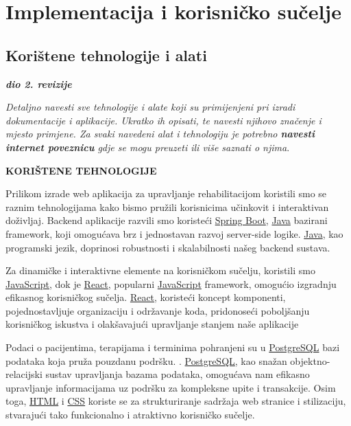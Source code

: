 \chapter{Implementacija i korisničko sučelje}
		
		
		\section{Korištene tehnologije i alati}
		
			\textbf{\textit{dio 2. revizije}}
			
			 \textit{Detaljno navesti sve tehnologije i alate koji su primijenjeni pri izradi dokumentacije i aplikacije. Ukratko ih opisati, te navesti njihovo značenje i mjesto primjene. Za svaki navedeni alat i tehnologiju je potrebno \textbf{navesti internet poveznicu} gdje se mogu preuzeti ili više saznati o njima}.
			
\textbf{	KORIŠTENE TEHNOLOGIJE
} 

Prilikom izrade web aplikacija za upravljanje rehabilitacijom koristili smo se raznim tehnologijama kako bismo pružili korisnicima učinkovit i interaktivan doživljaj. Backend aplikacije razvili smo koristeći \href{https://www.spring.io/projects/spring-boot}{Spring Boot}, \href{https://www.oracle.com/java}{Java} bazirani framework, koji omogućava brz i jednostavan razvoj server-side logike. \href{https://www.oracle.com/java}{Java}, kao programski jezik, doprinosi robustnosti i skalabilnosti našeg backend sustava.

Za dinamičke i interaktivne elemente na korisničkom sučelju, koristili smo \href{https://www.developer.mozilla.org/en-US/docs/Web/JavaScript}{JavaScript}, dok je \href{https://www.reactjs.org}{React}, popularni \href{https://www.developer.mozilla.org/en-US/docs/Web/JavaScript}{JavaScript} framework, omogućio izgradnju efikasnog korisničkog sučelja. \href{https://www.reactjs.org}{React}, koristeći koncept komponenti, pojednostavljuje organizaciju i održavanje koda, pridonoseći poboljšanju korisničkog iskustva i olakšavajući upravljanje stanjem naše aplikacije 

Podaci o pacijentima, terapijama i terminima pohranjeni su u \href{https://www.postgresql.org}{PostgreSQL} bazi podataka koja pruža pouzdanu podršku. . \href{https://www.postgresql.org}{PostgreSQL}, kao snažan objektno-relacijski sustav upravljanja bazama podataka, omogućava nam efikasno upravljanje informacijama uz podršku za kompleksne upite i transakcije. Osim toga, \href{https://www.developer.mozilla.org/en-US/docs/Web/HTML}{HTML} i \href{https://www.developer.mozilla.org/en-US/docs/Web/CSS}{CSS} koriste se za strukturiranje sadržaja web stranice i stilizaciju, stvarajući tako funkcionalno i atraktivno korisničko sučelje.

